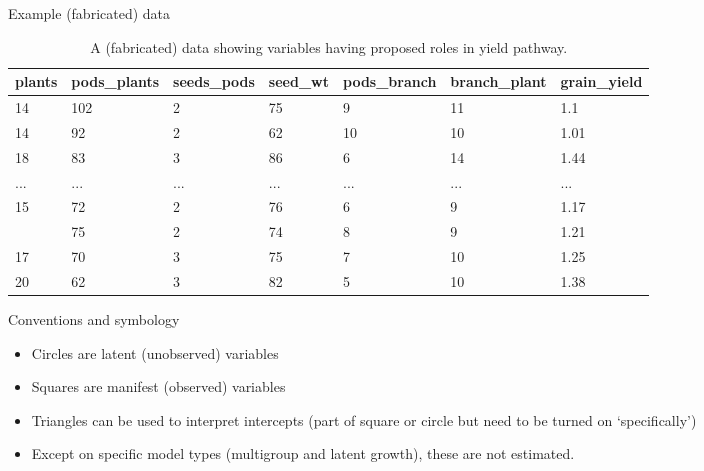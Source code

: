\documentclass[11pt,dvipsnames,ignorenonframetext,aspectratio=169]{beamer}
\begin{document}
\begin{frame}{Example (fabricated) data}
\protect\hypertarget{example-fabricated-data}{}
\begin{table}

\caption{\label{tab:soydata-preview}A (fabricated) data showing variables having proposed roles in yield pathway.}
\centering
\fontsize{8}{10}\selectfont
\begin{tabular}[t]{lllllll}
\toprule
plants & pods\_plants & seeds\_pods & seed\_wt & pods\_branch & branch\_plant & grain\_yield\\
\midrule
14 & 102 & 2 & 75 & 9 & 11 & 1.1\\
14 & 92 & 2 & 62 & 10 & 10 & 1.01\\
18 & 83 & 3 & 86 & 6 & 14 & 1.44\\
... & ... & ... & ... & ... & ... & ...\\
15 & 72 & 2 & 76 & 6 & 9 & 1.17\\
\addlinespace
19 & 75 & 2 & 74 & 8 & 9 & 1.21\\
17 & 70 & 3 & 75 & 7 & 10 & 1.25\\
20 & 62 & 3 & 82 & 5 & 10 & 1.38\\
\bottomrule
\end{tabular}
\end{table}
\end{frame}

\begin{frame}{Conventions and symbology}
\protect\hypertarget{conventions-and-symbology}{}
\begin{itemize}
\item
  Circles are latent (unobserved) variables
\item
  Squares are manifest (observed) variables
\item
  Triangles can be used to interpret intercepts (part of square or
  circle but need to be turned on `specifically')
\item
  Except on specific model types (multigroup and latent growth), these
  are not estimated.
\end{itemize}
\end{frame}
\end{document}
